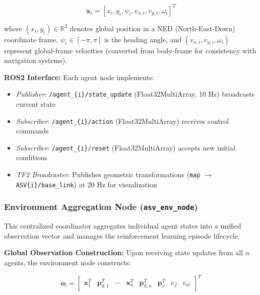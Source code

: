 \documentclass[preprint,3p]{elsarticle}
\begin{document}
\begin{equation}
    \mathbf{x}_i = [x_i, y_i, \psi_i, v_{x,i}, v_{y,i}, \omega_i]^T
\end{equation}

where $(x_i, y_i) \in \mathbb{R}^2$ denotes global position in a NED (North-East-Down) coordinate frame, $\psi_i \in [-\pi, \pi]$ is the heading angle, and $(v_{x,i}, v_{y,i}, \omega_i)$ represent global-frame velocities (converted from body-frame for consistency with navigation systems).

\vspace{1em}

\textbf{ROS2 Interface:} Each agent node implements:
\begin{itemize}
    \item \textit{Publisher}: \texttt{/agent\_\{i\}/state\_update} (Float32MultiArray, 10 Hz) broadcasts current state
    \item \textit{Subscriber}: \texttt{/agent\_\{i\}/action} (Float32MultiArray) receives control commands
    \item \textit{Subscriber}: \texttt{/agent\_\{i\}/reset} (Float32MultiArray) accepts new initial conditions
    \item \textit{TF2 Broadcaster}: Publishes geometric transformations (\texttt{map} $\rightarrow$ \texttt{ASV\{i\}/base\_link}) at 20 Hz for visualization
\end{itemize}

\subsubsection{Environment Aggregation Node (\texttt{asv\_env\_node})}

This centralized coordinator aggregates individual agent states into a unified observation vector and manages the reinforcement learning episode lifecycle.

\vspace{1em}

\textbf{Global Observation Construction:} Upon receiving state updates from all $n$ agents, the environment node constructs:

\begin{equation}
    \mathbf{o}_t = \begin{bmatrix}
        \mathbf{x}_1^T & \mathbf{p}_{d,1}^T & \cdots & \mathbf{x}_n^T & \mathbf{p}_{d,n}^T & \mathbf{p}_v^T & e_f & e_{ct}
    \end{bmatrix}^T
\end{equation}
\end{document}
